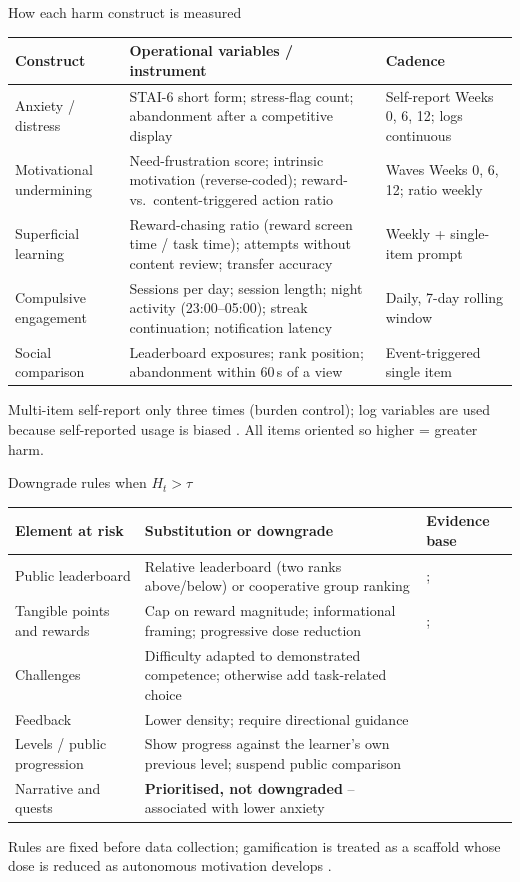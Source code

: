 \documentclass[10pt]{beamer}
\begin{document}
\begin{frame}{How each harm construct is measured}
\footnotesize
\begin{tabular}{|L{2.5cm}|L{5.0cm}|L{2.4cm}|}
\hline
\centering\textbf{Construct} & \centering\textbf{Operational variables / instrument} & \centering\textbf{Cadence}
\tabularnewline
\hline
Anxiety / distress & STAI-6 short form; stress-flag count; abandonment after a competitive display & Self-report Weeks 0, 6, 12; logs continuous
\tabularnewline
\hline
Motivational undermining & Need-frustration score; intrinsic motivation (reverse-coded); reward- vs.\ content-triggered action ratio & Waves Weeks 0, 6, 12; ratio weekly
\tabularnewline
\hline
Superficial learning & Reward-chasing ratio (reward screen time / task time); attempts without content review; transfer accuracy & Weekly + single-item prompt
\tabularnewline
\hline
Compulsive engagement & Sessions per day; session length; night activity (23:00--05:00); streak continuation; notification latency & Daily, 7-day rolling window
\tabularnewline
\hline
Social comparison & Leaderboard exposures; rank position; abandonment within 60\,s of a view & Event-triggered single item
\tabularnewline
\hline
\end{tabular}
\vspace{0.2cm}

\small Multi-item self-report only three times (burden control); log variables are used because
self-reported usage is biased \cite{gul2026brainrot}. All items oriented so higher = greater harm.
\end{frame}

\begin{frame}{Downgrade rules when $H_t > \tau$}
\footnotesize
\begin{tabular}{|L{2.6cm}|L{4.6cm}|L{2.6cm}|}
\hline
\centering\textbf{Element at risk} & \centering\textbf{Substitution or downgrade} & \centering\textbf{Evidence base}
\tabularnewline
\hline
Public leaderboard & Relative leaderboard (two ranks above/below) or cooperative group ranking & \textcite{nugroho2025negative}; \textcite{edwards2022anxiety}
\tabularnewline
\hline
Tangible points and rewards & Cap on reward magnitude; informational framing; progressive dose reduction & \textcite{gao2024sdt}; \textcite{nugroho2025negative}
\tabularnewline
\hline
Challenges & Difficulty adapted to demonstrated competence; otherwise add task-related choice & \textcite{gao2024sdt}
\tabularnewline
\hline
Feedback & Lower density; require directional guidance & \textcite{nugroho2025negative}
\tabularnewline
\hline
Levels / public progression & Show progress against the learner's own previous level; suspend public comparison & \textcite{nugroho2025negative}
\tabularnewline
\hline
Narrative and quests & \textbf{Prioritised, not downgraded} -- associated with lower anxiety & \textcite{edwards2022anxiety}
\tabularnewline
\hline
\end{tabular}
\vspace{0.2cm}

\small Rules are fixed before data collection; gamification is treated as a scaffold whose dose
is reduced as autonomous motivation develops \cite{gao2024sdt}.
\end{frame}
\end{document}
